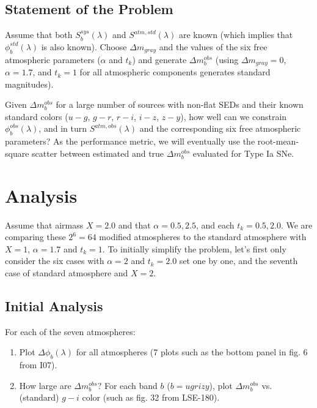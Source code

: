 \documentclass[12pt,preprint]{aastex}
\begin{document}
\subsection{Statement of the Problem} 

Assume that both $S^{sys}_b(\lambda)$ and $S^{atm,std}(\lambda)$ are known (which
implies that $\phi_b^{std}(\lambda)$ is also known). Choose $\Delta m_{gray}$ and the values of 
the six free atmospheric parameters ($\alpha$ and $t_k$) and generate $\Delta m_b^{obs}$
(using $\Delta m_{gray}=0$, $\alpha=1.7$, and $t_k=1$ for all atmospheric components 
generates standard magnitudes). 

Given $\Delta m_b^{obs}$ for a large number of sources with non-flat SEDs
and their known standard colors ($u-g$, $g-r$, $r-i$, $i-z$, $z-y$), how well can we
constrain $\phi_b^{obs}(\lambda)$, and in turn $S^{atm,obs}(\lambda)$ and the corresponding 
six free atmospheric parameters?  As the performance metric, we will eventually use the 
root-mean-square scatter between estimated and true $\Delta m_b^{obs}$ evaluated for Type Ia SNe. 



\section{Analysis} 

Assume that airmass $X=2.0$ and that $\alpha=0.5, 2.5$, and each $t_k=0.5, 2.0$.
We are comparing these $2^6 = 64$ modified atmospheres to the standard atmosphere
with $X=1$, $\alpha=1.7$ and $t_k=1$. To initially simplify the problem, let's first only
consider the six cases with $\alpha=2$ and $t_k=2.0$ set one by one, and the 
seventh case of standard atmosphere and $X=2$. 


\subsection{Initial Analysis} 

For each of the seven atmospheres: 

\begin{enumerate} 
\item Plot $\Delta \phi_b(\lambda)$ for all atmospheres (7 plots such as the
bottom panel in fig. 6 from I07). 
\item
How large are $\Delta m_b^{obs}$? 
For each band $b$ ($b=ugrizy$), plot $\Delta m_b^{obs}$ vs. (standard) $g-i$ color
(such as fig. 32 from LSE-180). 
\end{enumerate} 
\end{document}
